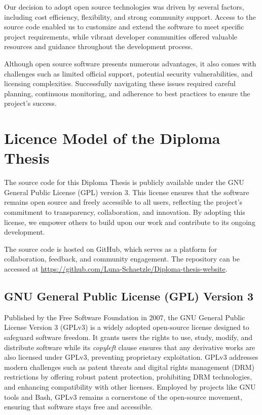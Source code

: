Our decision to adopt open source technologies was driven by several factors, 
including cost efficiency, flexibility, and strong community support. 
Access to the source code enabled us to customize and extend the software to meet specific project requirements, 
while vibrant developer communities offered valuable resources and guidance throughout the development process.

Although open source software presents numerous advantages, it also comes with challenges such as limited official support, 
potential security vulnerabilities, and licensing complexities. Successfully navigating these issues required careful planning, 
continuous monitoring, and adherence to best practices to ensure the project's success.

\section{Licence Model of the Diploma Thesis}

The source code for this Diploma Thesis is publicly available under the GNU General Public License (GPL) version 3. 
This license ensures that the software remains open source and freely accessible to all users, 
reflecting the project's commitment to transparency, collaboration, and innovation. By adopting this license, 
we empower others to build upon our work and contribute to its ongoing development.

The source code is hosted on GitHub, which serves as a platform for collaboration, feedback, and community engagement. 
The repository can be accessed at \url{https://github.com/Luna-Schaetzle/Diploma-thesis-website}.

\subsection{GNU General Public License (GPL) Version 3}

Published by the Free Software Foundation in 2007, the GNU General Public License Version 3 (GPLv3) is a widely adopted open-source license designed to safeguard software freedom. 
It grants users the rights to use, study, modify, and distribute software while its \textit{copyleft} clause ensures that any derivative works are also licensed under GPLv3, 
preventing proprietary exploitation. GPLv3 addresses modern challenges such as patent threats and digital rights management (DRM) restrictions by offering robust patent protection, prohibiting DRM technologies, 
and enhancing compatibility with other licenses. Employed by projects like GNU tools and Bash, GPLv3 remains a cornerstone of the open-source movement, ensuring that software stays free and accessible.

